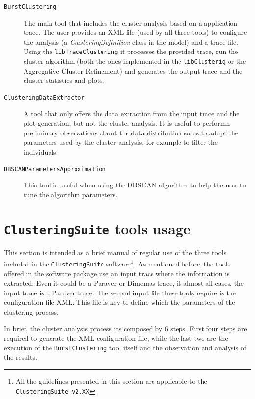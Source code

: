 \documentclass[a4paper, 12pt]{article}
\begin{document}
\begin{description}
  
  \item[\texttt{BurstClustering}] The main tool that includes the cluster
  analysis based on a application trace. The user provides an XML file (used
  by all three tools) to configure the analysis (a \textit{ClusteringDefinition}
  class in the model) and a trace file. Using the \texttt{libTrace\-Clustering}
  it processes the provided trace, run the cluster algorithm (both the ones
  implemented in the \texttt{libClusterig} or the Aggregative Cluster 
  Refinement) and generates the output trace and the cluster statistics and
  plots.
  
  \item[\texttt{Clustering\-DataExtractor}] A tool that only offers the data
  extraction from the input trace and the plot generation, but not the
  cluster analysis. It is useful to performn preliminary observations about
  the data distribution so as to adapt the parameters used by the cluster
  analysis, for example to filter the individuals.
  
  \item[\texttt{DBSCANParametersApproximation}] This tool is useful when 
  using the DBSCAN algorithm to help the user to tune the algorithm 
  parameters.
  
\end{description}

\section{\texttt{ClusteringSuite} tools usage}

This section is intended as a brief manual of regular use of the three tools 
included in the \texttt{ClusteringSuite} software\footnote{All the guidelines
presented in this section are applicable to the \texttt{ClusteringSuite v2.XX} }.
As mentioned before, the tools offered in the software package use an input
trace where the information is extracted. Even it could be a Paraver or
Dimemas trace, it almost all cases, the input trace is a Paraver trace. The
second input file these tools require is the configuration file XML. This file
is key to define which the parameters of the clustering process.

In brief, the cluster analysis process its composed by 6 steps. First four
steps are required to generate the XML configuration file, while the
last two are the execution of the \texttt{BurstClustering} tool itself and
the observation and analysis of the results.
\end{document}
